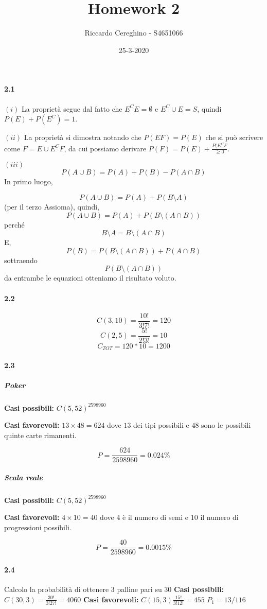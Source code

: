 \documentclass{article}
\begin{document}
\title{Homework 2}
\author{Riccardo Cereghino - S4651066}
\date{25-3-2020}
\maketitle

\paragraph{2.1}%
\label{par:2.1}
$(i)$ La proprietà segue dal fatto che $E^CE=\emptyset$ e $E^C\cup E=S$, quindi
$P(E)+P(E^C)=1$.

$(ii)$ La proprietà si dimostra notando che $P(EF)=P(E)$ che si può scrivere
come $F=E\cup E^CF$, da cui possiamo derivare $P(F)=P(E)+\frac{P(E^C F}{\geq0}$.

 $(iii)$
\[P(A\cup B)=P(A)+P(B)-P(A\cap B)\]
In primo luogo,

\[P(A\cup B)=P(A)+P(B\setminus A)\]
 (per il terzo Assioma), quindi,
\[P(A\cup B)=P(A)+P(B\setminus (A\cap B))\]
perché
 \[B\setminus A=B\setminus (A\cap B)\]
E,
\[P(B)=P(B\setminus (A\cap B))+P(A\cap B)\]
sottraendo 
\[P(B\setminus (A\cap B))\]
da entrambe le equazioni otteniamo il risultato voluto.

\paragraph{2.2}%
\label{par:2.2}
\[C(3,10)= \frac{10!}{3!7!}=120 \]
\[C(2,5)= \frac{5!}{2!3!}=10 \]
\[C_{TOT}=120*10=1200\]

\paragraph{2.3}%
\label{par:2.3}
\subparagraph{Poker}%
\label{subp:Poker}
\textbf{Casi possibili:} $C(5,52)^ 2598960$

\textbf{Casi favorevoli:} $13\times48=624$ dove $13$ dei tipi
possibili e $48$ sono le possibili quinte carte rimanenti.

\[P= \frac{624}{2598960}=0.024\%\]

\subparagraph{Scala reale}%
\label{subp:Scala reale}
\textbf{Casi possibili:} $C(5,52)^ 2598960$

\textbf{Casi favorevoli:} $4\times10=40$ dove $4$ è il numero di semi e 
$10$ il numero di progressioni possibili.

\[P= \frac{40}{2598960}=0.0015\%\]

\paragraph{2.4}%
\label{par:2.4}
Calcolo la probabilità di ottenere $3$ palline pari su $30$
\textbf{Casi possibili:} $C(30,3)= \frac{30!}{3!27!} = 4060$
\textbf{Casi favorevoli:} $C(15,3) \frac{15!}{3!12!} = 455$
$P_1=13/116$
\end{document}
